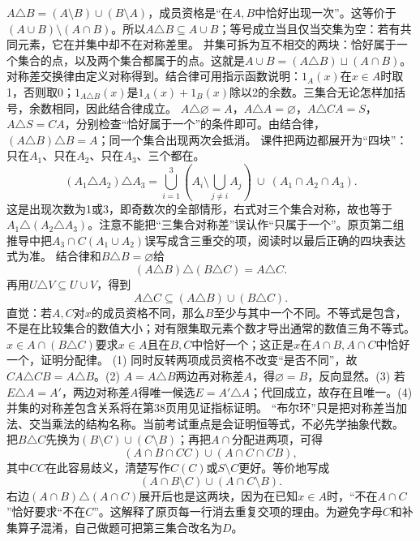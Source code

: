 $A\triangle B=(A\setminus B)\cup(B\setminus A)$，成员资格是“在$A,B$中恰好出现一次”。这等价于$(A\cup B)\setminus(A\cap B)$。所以$A\triangle B\subseteq A\cup B$；等号成立当且仅当交集为空：若有共同元素，它在并集中却不在对称差里。
并集可拆为互不相交的两块：恰好属于一个集合的点，以及两个集合都属于的点。这就是$A\cup B=(A\triangle B)\sqcup(A\cap B)$。
对称差交换律由定义对称得到。结合律可用指示函数说明：$1_A(x)$在$x\in A$时取1，否则取0；$1_{A\triangle B}(x)$是$1_A(x)+1_B(x)$除以2的余数。三集合无论怎样加括号，余数相同，因此结合律成立。
$A\triangle\varnothing=A$，$A\triangle A=\varnothing$，$A\triangle CA=S$，$A\triangle S=CA$，分别检查“恰好属于一个”的条件即可。由结合律，$(A\triangle B)\triangle B=A$；同一个集合出现两次会抵消。
课件把两边都展开为“四块”：只在$A_1$、只在$A_2$、只在$A_3$、三个都在。
\[(A_1\triangle A_2)\triangle A_3=\bigcup_{i=1}^3\left(A_i\setminus\bigcup_{j\ne i}A_j\right)\ \cup\ (A_1\cap A_2\cap A_3).\]
这是出现次数为1或3，即奇数次的全部情形，右式对三个集合对称，故也等于$A_1\triangle(A_2\triangle A_3)$。注意不能把“三集合对称差”误认作“只属于一个”。原页第二组推导中把$A_3\cap C(A_1\cup A_2)$误写成含三重交的项，阅读时以最后正确的四块表达式为准。
结合律和$B\triangle B=\varnothing$给
\[(A\triangle B)\triangle(B\triangle C)=A\triangle C.\]
再用$U\triangle V\subseteq U\cup V$，得到
\[A\triangle C\subseteq(A\triangle B)\cup(B\triangle C).\]
直觉：若$A,C$对$x$的成员资格不同，那么$B$至少与其中一个不同。不等式是包含，不是在比较集合的数值大小；对有限集取元素个数才导出通常的数值三角不等式。
$x\in A\cap(B\triangle C)$要求$x\in A$且在$B,C$中恰好一个；这正是$x$在$A\cap B,A\cap C$中恰好一个，证明分配律。
(1) 同时反转两项成员资格不改变“是否不同”，故$CA\triangle CB=A\triangle B$。(2) $A=A\triangle B$两边再对称差$A$，得$\varnothing=B$，反向显然。(3) 若$E\triangle A=A'$，两边对称差$A$得唯一候选$E=A'\triangle A$；代回成立，故存在且唯一。(4) 并集的对称差包含关系将在第38页用见证指标证明。
“布尔环”只是把对称差当加法、交当乘法的结构名称。当前考试重点是会证明恒等式，不必先学抽象代数。
把$B\triangle C$先换为$(B\setminus C)\cup(C\setminus B)$；再把$A\cap$分配进两项，可得
\[(A\cap B\cap CC)\cup(A\cap C\cap CB),\]
其中$CC$在此容易歧义，清楚写作$C(C)$或$S\setminus C$更好。等价地写成
\[(A\cap B\setminus C)\cup(A\cap C\setminus B).\]
右边$(A\cap B)\triangle(A\cap C)$展开后也是这两块，因为在已知$x\in A$时，“不在$A\cap C$”恰好要求“不在$C$”。这解释了原页每一行消去重复交项的理由。为避免字母$C$和补集算子混淆，自己做题可把第三集合改名为$D$。
